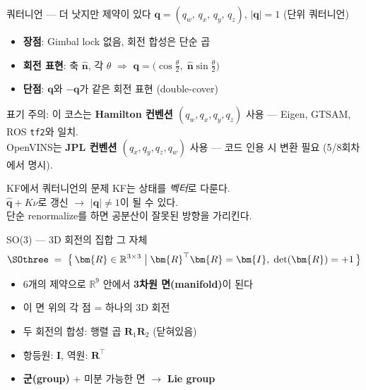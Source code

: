 \begin{frame}{쿼터니언 — 더 낫지만 제약이 있다}
  $\mathbf{q} = (q_w,\, q_x,\, q_y,\, q_z)$, \quad $|\mathbf{q}|=1$ (단위 쿼터니언)
  \vspace{0.4em}
  \begin{itemize}
    \item \textbf{장점}: Gimbal lock 없음, 회전 합성은 단순 곱
    \item \textbf{회전 표현}: 축 $\hat{\mathbf{n}}$, 각 $\theta$ $\Rightarrow$
          $\mathbf{q} = \bigl(\cos\tfrac{\theta}{2},\; \hat{\mathbf{n}}\sin\tfrac{\theta}{2}\bigr)$
    \item \textbf{단점}: $\mathbf{q}$와 $-\mathbf{q}$가 같은 회전 표현 (double-cover)
  \end{itemize}
  \vspace{0.3em}
  \scriptsize
  \alert{표기 주의}: 이 코스는 \textbf{Hamilton 컨벤션 $(q_w, q_x, q_y, q_z)$} 사용 — Eigen, GTSAM, ROS \texttt{tf2}와 일치.\\
  OpenVINS는 \textbf{JPL 컨벤션 $(q_x, q_y, q_z, q_w)$} 사용 — 코드 인용 시 변환 필요 (5/8회차에서 명시).
  \pause
  \vspace{0.4em}
  \begin{alertblock}{KF에서 쿼터니언의 문제}
    KF는 상태를 \emph{벡터}로 다룬다.\\
    $\hat{\mathbf{q}} + K\nu$로 갱신 $\rightarrow$ $|\mathbf{q}|\neq 1$이 될 수 있다.\\
    단순 renormalize를 하면 공분산이 잘못된 방향을 가리킨다.
  \end{alertblock}
\end{frame}

\begin{frame}{SO(3) — 3D 회전의 집합 그 자체}
  \[
    \SOthree \;=\; \bigl\{\, \bm{R} \in \mathbb{R}^{3\times3} \;\big|\;
    \bm{R}^\top\bm{R} = \bm{I},\; \det(\bm{R}) = +1 \,\bigr\}
  \]
  \begin{itemize}
    \item 6개의 제약으로 $\mathbb{R}^{9}$ 안에서 \textbf{3차원 면(manifold)}이 된다
    \item 이 면 위의 각 점 = 하나의 3D 회전
    \item 두 회전의 합성: 행렬 곱 $\bm{R}_1\bm{R}_2$ (닫혀있음)
    \item 항등원: $\bm{I}$, \quad 역원: $\bm{R}^\top$
    \item \textbf{군(group)} + 미분 가능한 면 $\rightarrow$ \textbf{Lie group}
  \end{itemize}
\end{frame}

